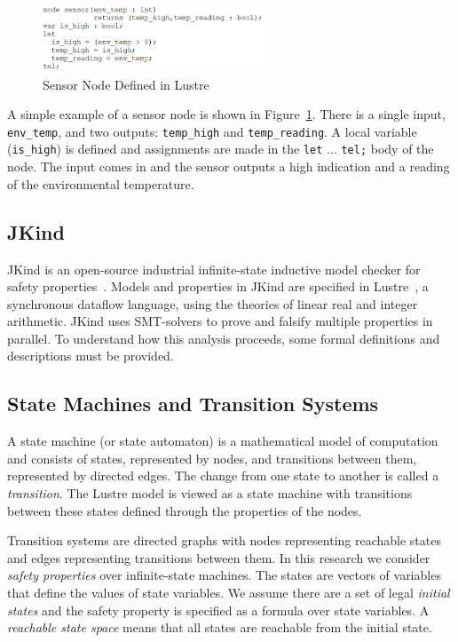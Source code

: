 \begin{figure}[h]
	\begin{center}
		\includegraphics[width=0.6\textwidth]{images/lustreExample.PNG}
	\end{center}
	\caption{Sensor Node Defined in Lustre}
	\label{fig:lustreExample}
\end{figure}

A simple example of a sensor node is shown in Figure~\ref{fig:lustreExample}. There is a single input, \texttt{env\_temp}, and two outputs: \texttt{temp\_high} and \texttt{temp\_reading}. A local variable (\texttt{is\_high}) is defined and assignments are made in the \texttt{let} ... \texttt{tel;} body of the node. The input comes in and the sensor outputs a high indication and a reading of the environmental temperature. 

\subsection{JKind}
JKind is an open-source industrial infinite-state inductive model checker for safety properties~\cite{2017arXiv171201222G}. Models and properties in JKind are specified in Lustre~\cite{Halbwachs91:IEEE}, a synchronous dataflow language, using the theories of linear real and integer arithmetic. JKind uses SMT-solvers to prove and falsify multiple properties in parallel. To understand how this analysis proceeds, some formal definitions and descriptions must be provided. 

\subsection{State Machines and Transition Systems}
A state machine (or state automaton) is a mathematical model of computation and consists of states, represented by nodes, and transitions between them, represented by directed edges. The change from one state to another is called a {\em transition}. The Lustre model is viewed as a state machine with transitions between these states defined through the properties of the nodes. 

Transition systems are directed graphs with nodes representing reachable states and edges representing transitions between them. In this research we consider \emph{safety properties} over infinite-state machines. The states are vectors of variables that define the values of state variables. We assume there are a set of legal \emph{initial states} and the safety property is specified as a formula over state variables. A \emph{reachable state space} means that all states are reachable from the initial state. 

